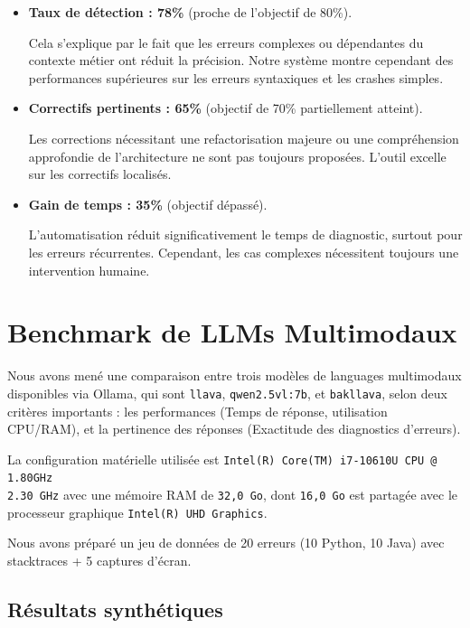 \documentclass[12pt,a4paper]{report}
\begin{document}
	\begin{itemize}
		
		\item \textbf{Taux de détection : 78\%} (proche de l’objectif de 80\%).
		
		Cela s'explique par le fait que les erreurs complexes ou dépendantes du contexte métier ont réduit la précision. Notre système montre cependant des performances supérieures sur les erreurs syntaxiques et les crashes simples.
		
		\item \textbf{Correctifs pertinents : 65\%} (objectif de 70\% partiellement atteint).
		
		Les corrections nécessitant une refactorisation majeure ou une compréhension approfondie de l’architecture ne sont pas toujours proposées. L’outil excelle sur les correctifs localisés.
		
		\item \textbf{Gain de temps : 35\%} (objectif dépassé).
		
		L’automatisation réduit significativement le temps de diagnostic, surtout pour les erreurs récurrentes. Cependant, les cas complexes nécessitent toujours une intervention humaine.
		
	\end{itemize}
	
	\section*{Benchmark de LLMs Multimodaux}
	
	Nous avons mené une comparaison entre trois modèles de languages multimodaux disponibles via Ollama, qui sont \verb|llava|, \verb|qwen2.5vl:7b|, et \verb|bakllava|, selon deux critères importants : les performances (Temps de réponse, utilisation CPU/RAM), et la pertinence des réponses (Exactitude des diagnostics d'erreurs).
	
	La configuration matérielle utilisée est \verb|Intel(R) Core(TM) i7-10610U CPU @ 1.80GHz| \\ \verb|2.30 GHz| avec une mémoire RAM de \verb|32,0 Go|, dont \verb|16,0 Go| est partagée avec le processeur graphique \verb|Intel(R) UHD Graphics|.
	
	Nous avons préparé un jeu de données de 20 erreurs (10 Python, 10 Java) avec stacktraces + 5 captures d’écran.
	
	\subsection*{Résultats synthétiques}
	
\end{document}

